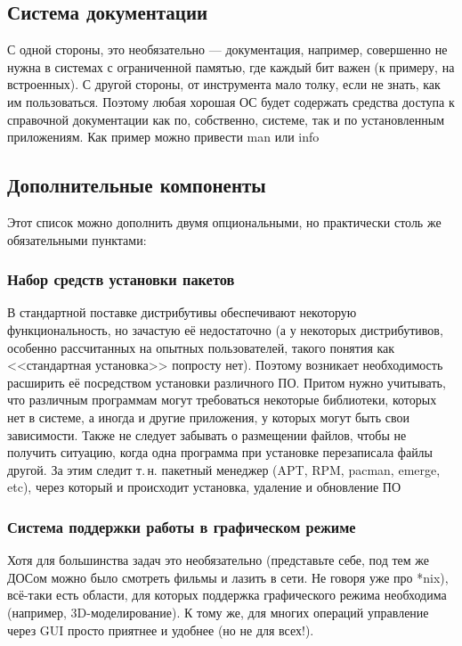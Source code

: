 \subsection{Система документации}
С одной стороны, это необязательно --- документация, например, совершенно не нужна в системах с ограниченной памятью, где каждый бит важен (к примеру, на встроенных). С другой стороны, от инструмента мало толку, если не знать, как им пользоваться. Поэтому любая хорошая ОС будет содержать средства доступа к справочной документации как по, собственно, системе, так и по установленным приложениям. Как пример можно привести man или info

\subsection{Дополнительные компоненты}
Этот список можно дополнить двумя опциональными, но практически столь же обязательными пунктами:

\subsubsection{Набор средств установки пакетов}
В стандартной поставке дистрибутивы обеспечивают некоторую функциональность, но зачастую её недостаточно (а у некоторых дистрибутивов, особенно рассчитанных на опытных пользователей, такого понятия как <<стандартная установка>> попросту нет). Поэтому возникает необходимость расширить её посредством установки различного ПО. Притом нужно учитывать, что различным программам могут требоваться некоторые библиотеки, которых нет в системе, а иногда и другие приложения, у которых могут быть свои зависимости. Также не следует забывать о размещении файлов, чтобы не получить ситуацию, когда одна программа при установке перезаписала файлы другой. За этим следит т.\,н. пакетный менеджер (APT, RPM, pacman, emerge, etc), через который и происходит установка, удаление и обновление ПО

\subsubsection{Система поддержки работы в графическом режиме}
Хотя для большинства задач это необязательно (представьте себе, под тем же ДОСом можно было смотреть фильмы и лазить в сети. Не говоря уже про *nix), всё-таки есть области, для которых поддержка графического режима необходима (например, 3D-моделирование). К тому же, для многих операций управление через GUI просто приятнее и удобнее (но не для всех!).

